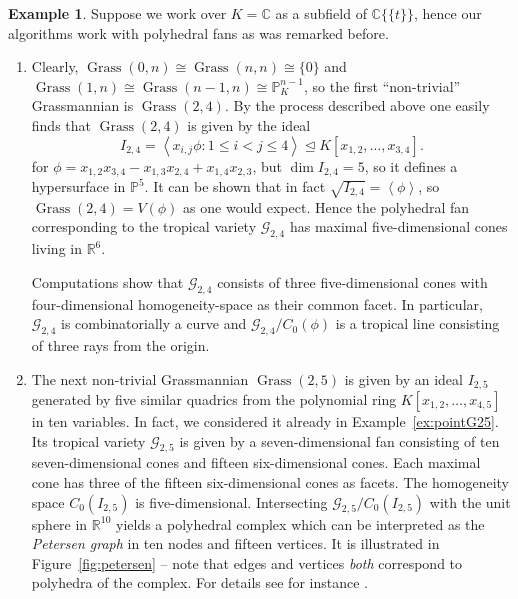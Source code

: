 \documentclass[
  paper=a4,
  titlepage,
  bibliography=totoc,
  pagesize=pdftex
]{scrartcl}
\numberwithin{figure}{section}
\numberwithin{equation}{section}
\numberwithin{table}{section}
\newcommand*\setR{\mathds{R}}
\newcommand*\setC{\mathds{C}}
\newcommand*\setP{\mathds{P}}
\newcommand*\ideal[1]{\left\langle #1 \right\rangle}
\newcommand*\puiseux[2]{#1\{\!\{#2\}\!\}}
\newcommand*\CCt{\puiseux{\setC}{t}}
\let\idealof\trianglelefteq
\DeclareMathOperator{\Grass}{Grass}
\theoremstyle{definition}
\newtheorem{example}[definition]{Example}
\numberwithin{definition}{section}
\begin{document}
\begin{example} \label{ex:tropGrass}
  Suppose we work over $K = \setC$ as a subfield of $\CCt$, hence our algorithms work with
  polyhedral fans as was remarked before.
  \begin{enumerate}
    \item Clearly, $\Grass(0,n) \cong \Grass(n,n) \cong \{0\}$ and $\Grass(1,n) \cong
      \Grass(n-1, n) \cong \setP_K^{n-1}$, so the first \enquote{non-trivial} Grassmannian
      is $\Grass(2,4)$. By the process described above one easily finds that $\Grass(2,4)$
      is given by the ideal
      \[
        I_{2,4} = \ideal{ x_{i,j} \phi : 1 \leq i < j \leq 4 }
        \idealof K[x_{1,2}, \dots, x_{3,4}].
      \]
      for $\phi = x_{1,2}x_{3,4} - x_{1,3}x_{2,4} + x_{1,4}x_{2,3}$, but $\dim I_{2,4} =
      5$, so it defines a hypersurface in $\setP^5$. It can be shown that in fact
      $\sqrt{I_{2,4}} = \ideal \phi$, so $\Grass(2,4) = V(\phi)$ as one would expect.
      Hence the polyhedral fan corresponding to the tropical variety $\mathcal G_{2,4}$
      has maximal five-dimensional cones living in $\setR^6$.

      Computations show that $\mathcal G_{2,4}$ consists of three five-dimensional cones
      with four-dimensional homogeneity-space as their common facet. In particular,
      $\mathcal G_{2,4}$ is combinatorially a curve and $\mathcal G_{2,4}/C_0(\phi)$ is a
      tropical line consisting of three rays from the origin.
    \item The next non-trivial Grassmannian $\Grass(2,5)$ is given by an ideal $I_{2,5}$
      generated by five similar quadrics from the polynomial ring $K[x_{1,2}, \dots,
      x_{4,5}]$ in ten variables. In fact, we considered it already in
      Example~\ref{ex:pointG25}. Its tropical variety $\mathcal G_{2,5}$ is given by a
      seven-dimensional fan consisting of ten seven-dimensional cones and fifteen
      six-dimensional cones. Each maximal cone has three of the fifteen six-dimensional
      cones as facets. The homogeneity space $C_0(I_{2,5})$ is five-dimensional.
      Intersecting $\mathcal G_{2,5}/C_0(I_{2,5})$ with the unit sphere in $\setR^{10}$
      yields a polyhedral complex which can be interpreted as the \emph{Petersen graph} in
      ten nodes and fifteen vertices. It is illustrated in Figure~\ref{fig:petersen} --
      note that edges and vertices \emph{both} correspond to polyhedra of the complex. For
      details see for instance \cite[Example~9.10]{sturmSolve}.
  \end{enumerate}
\end{example}
\end{document}
